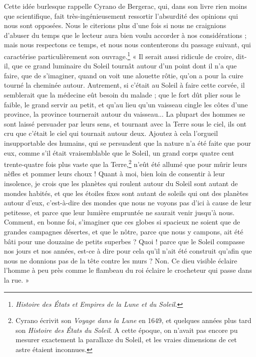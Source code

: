 \documentclass[a4paper, 11pt, oneside, landscape]{article}
\begin{document}
Cette idée burlesque rappelle Cyrano de Bergerac, qui, dans son livre rien moins que scientifique, fait très-ingénieusement ressortir l'absurdité des opinions qui nous sont opposées. Nous le citerions plus d'une fois si nous ne craignions d'abuser du temps que le lecteur aura bien voulu accorder à nos considérations ; mais nous respectons ce temps, et nous nous contenterons du passage suivant, qui caractérise particulièrement son ouvrage.\footnote{\emph{Histoire des États et Empires de la Lune et du Soleil.}} « Il serait aussi ridicule de croire, dit-il, que ce grand luminaire du Soleil tournât autour d'un point dont il n'a que faire, que de s'imaginer, quand on voit une alouette rôtie, qu'on a pour la cuire tourné la cheminée autour. Autrement, si c'était au Soleil à faire cette corvée, il semblerait que la médecine eût besoin du malade ; que le fort dût plier sous le faible, le grand servir au petit, et qu'au lieu qu'un vaisseau cingle les côtes d'une province, la province tournerait autour du vaisseau... La plupart des hommes se sont laissé persuader par leurs sens, et tournant avec la Terre sous le ciel, ils ont cru que c'était le ciel qui tournait autour deux. Ajoutez à cela l'orgueil insupportable des humains, qui se persuadent que la nature n'a été faite que pour eux, comme s'il était vraisemblable que le Soleil, un grand corps quatre cent trente-quatre fois plus vaste que la Terre,\footnote{Cyrano écrivit son \emph{Voyage dans la Lune} en 1649, et quelques années plus tard son \emph{Histoire des États du Soleil}. A cette époque, on n'avait pas encore pu mesurer exactement la parallaxe du Soleil, et les vraies dimensions de cet astre étaient inconnues.} n'eût été allumé que pour mûrir leurs nèfles et pommer leurs choux ! Quant à moi, bien loin de consentir à leur insolence, je crois que les planètes qui roulent autour du Soleil sont autant de mondes habités, et que les étoiles fixes sont autant de soleils qui ont des planètes autour d'eux, c'est-à-dire des mondes que nous ne voyons pas d'ici à cause de leur petitesse, et parce que leur lumière empruntée ne saurait venir jusqu'à nous. Comment, en bonne foi, s'imaginer que ces globes si spacieux ne soient que de grandes campagnes désertes, et que le nôtre, parce que nous y campons, ait été bâti pour une douzaine de petits superbes ? Quoi ! parce que le Soleil compasse nos jours et nos années, est-ce à dire pour cela qu'il n'ait été construit qu'afin que nous ne donnions pas de la tête contre les murs ? Non. Ce dieu visible éclaire l'homme à peu près comme le flambeau du roi éclaire le crocheteur qui passe dans la rue. »
\end{document}
